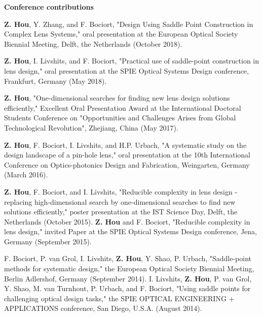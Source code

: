 \vspace{3mm}
\noindent
\Large{\textbf{Conference contributions}}
\begin{enumerate}\small{
\item \textbf{Z. Hou}, Y. Zhang, and F. Bociort, "Design Using Saddle Point Construction in Complex Lens Systems," oral presentation at the European Optical Society Biennial Meeting, Delft, the Netherlands (October 2018).
\item \textbf{Z. Hou}, I. Livshits, and F. Bociort, "Practical use of saddle-point construction in lens design," oral presentation at the SPIE Optical Systems Design conference, Frankfurt, Germany (May 2018).
\item \textbf{Z. Hou}, "One-dimensional searches for finding new lens design solutions efficiently,"  Excellent Oral Presentation Award at the International Doctoral Students Conference on "Opportunities and Challenges Arises from Global Technological Revolution", Zhejiang, China (May 2017).
\item \textbf{Z. Hou}, F. Bociort, I. Livshits, and H.P. Urbach, "A systematic study on the design landscape of a pin-hole lens," oral presentation at the 10th International Conference on Optics-photonics Design and Fabrication, Weingarten, Germany  (March 2016).
\item \textbf{Z. Hou}, F. Bociort, and I. Livshits, "Reducible complexity in lens design - 
replacing high-dimensional search by one-dimensional searches to find new solutions efficiently," poster presentation at the IST Science Day, Delft, the Netherlands (October 2015).
\textbf{Z. Hou} and F. Bociort, "Reducible complexity in lens design," invited Paper at the SPIE Optical Systems Design conference, Jena, Germany (September 2015). 
\item F. Bociort, P. van Grol, I. Livshits, \textbf{Z. Hou}, Y. Shao, P. Urbach, "Saddle-point methods for systematic design," the European Optical Society Biennial Meeting, Berlin Adlershof, Germany (September 2014).
I. Livshits, \textbf{Z. Hou}, P. van Grol, Y. Shao, M. van Turnhout, P. Urbach, and F. Bociort, "Using saddle points for challenging optical design tasks," the SPIE OPTICAL ENGINEERING + APPLICATIONS conference, San Diego, U.S.A. (August 2014).

}\end{enumerate}
